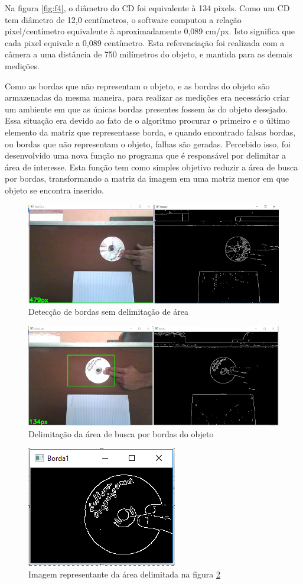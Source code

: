 \documentclass[12pt]{article}
\begin{document}
	Na figura \ref{fig:f4}, o diâmetro do CD foi equivalente à 134 pixels. Como um CD tem diâmetro de 12,0 centímetros, o software computou a relação pixel/centímetro equivalente à aproximadamente 0,089 cm/px. Isto significa que cada pixel equivale a 0,089 centímetro. Esta referenciação foi realizada com a câmera a uma distância de 750 milímetros do objeto, e mantida para as demais medições.
	
	Como as bordas que não representam o objeto, e as bordas do objeto são armazenadas da mesma maneira, para realizar as medições era necessário criar um ambiente em que as únicas bordas presentes fossem às do objeto desejado. Essa situação era devido ao fato de o algoritmo procurar o primeiro e o último elemento da matriz que representasse borda, e quando encontrado falsas bordas, ou bordas que não representam o objeto, falhas são geradas. Percebido isso, foi desenvolvido uma nova função no programa que é responsável por delimitar a área de interesse. Esta função tem como simples objetivo reduzir a área de busca por bordas, transformando a matriz da imagem em uma matriz menor em que objeto se encontra inserido.
	
	\begin{figure}[h!]
		\centering
		\includegraphics[width=0.7\linewidth]{img/F7}
		\caption{Detecção de bordas sem delimitação de área}
		\label{fig:f7}
	\end{figure}
	
	\begin{figure}[h!]
		\centering
		\includegraphics[width=0.7\linewidth]{img/F8}
		\caption{Delimitação da área de busca por bordas do objeto}
		\label{fig:f8}
	\end{figure}
	
	\begin{figure}[h!]
		\centering
		\includegraphics[width=0.25\linewidth]{img/F9}
		\caption{Imagem representante da área delimitada na figura \ref{fig:f8}}
		\label{fig:f9}
	\end{figure}
		
\end{document}
